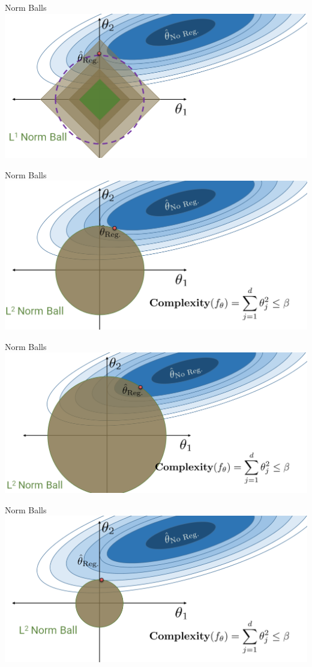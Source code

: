 \documentclass[aspectratio=169]{../latex_main/tntbeamer}  %
\begin{document}
	\begin{frame}{Norm Balls}
	    \includegraphics[scale=.35]{Bild12}
	\end{frame}
	
	\begin{frame}{Norm Balls}
	    \includegraphics[scale=.35]{Bild13}
	\end{frame}
	
	
	\begin{frame}{Norm Balls}
	    \includegraphics[scale=.35]{Bild14}
	\end{frame}
	
	
	\begin{frame}{Norm Balls}
	    \includegraphics[scale=.35]{Bild15}
	\end{frame}
	
\end{document}
